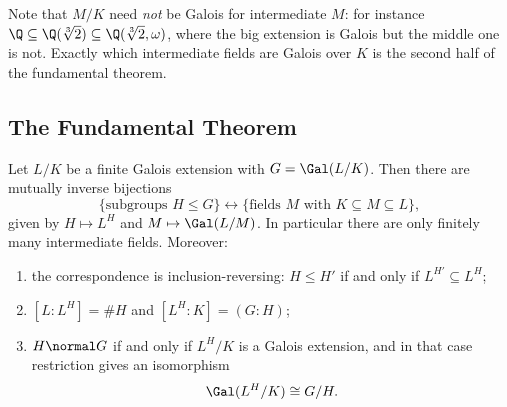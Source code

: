 Note that $M/K$ need \emph{not} be Galois for intermediate $M$: for instance $\Q \subseteq \Q(\sqrt[3]2) \subseteq \Q(\sqrt[3]2,\omega)$, where the big extension is Galois but the middle one is not. Exactly which intermediate fields are Galois over $K$ is the second half of the fundamental theorem.

\subsection{The Fundamental Theorem}

\begin{theorem}\label{thm:ftgt}
	Let $L/K$ be a finite Galois extension with $G = \Gal(L/K)$. Then there are mutually inverse bijections
	$$\{\text{subgroups } H \leq G\} \longleftrightarrow \{\text{fields } M \text{ with } K \subseteq M \subseteq L\},$$
	given by $H \mapsto L^H$ and $M \mapsto \Gal(L/M)$. In particular there are only finitely many intermediate fields. Moreover:
	\begin{enumerate}[label=(\roman*)]
		\item the correspondence is inclusion-reversing: $H \leq H'$ if and only if $L^{H'} \subseteq L^{H}$;
		\item $[L : L^H] = \#H$ and $[L^H : K] = (G : H)$;
		\item $H \normal G$ if and only if $L^H/K$ is a Galois extension, and in that case restriction gives an isomorphism
		$$\Gal(L^H/K) \cong G/H.$$
	\end{enumerate}
\end{theorem}

